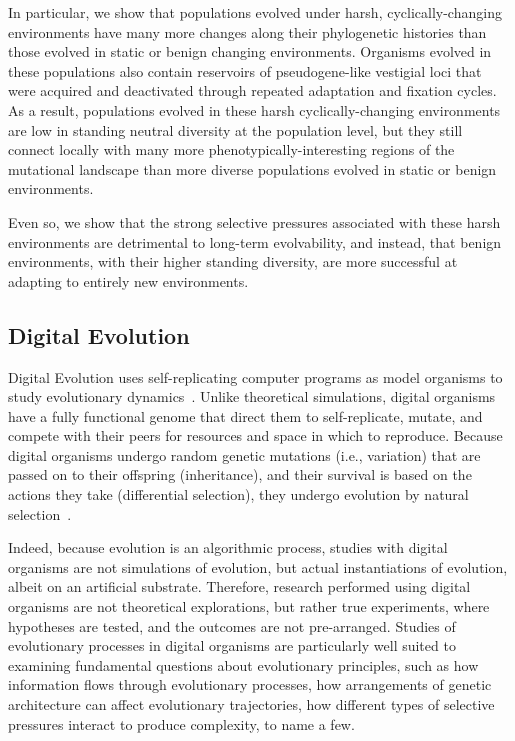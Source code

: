 \documentclass[10pt,letterpaper,final]{article}
\begin{document}
In particular, we show that populations evolved under harsh, cyclically-changing environments have many more changes along their phylogenetic histories than those evolved in static or benign changing environments. Organisms evolved in these populations also contain reservoirs of pseudogene-like vestigial loci that were acquired and deactivated through repeated adaptation and fixation cycles. As a result, populations evolved in these harsh cyclically-changing environments are low in standing neutral diversity at the population level, but they still connect locally with many more phenotypically-interesting regions of the mutational landscape than more diverse populations evolved in static or benign environments.

Even so, we show that the strong selective pressures associated with these harsh environments are detrimental to long-term evolvability, and instead, that benign environments, with their higher standing diversity, are more successful at adapting to entirely new environments.

\subsection*{Digital Evolution}
Digital Evolution uses self-replicating computer programs as model organisms to study evolutionary dynamics~\cite{mckinley_harnessing_2008}. Unlike theoretical simulations, digital organisms have a fully functional genome that direct them to self-replicate, mutate, and compete with their peers for resources and space in which to reproduce. Because digital organisms undergo random genetic mutations (i.e., variation) that are passed on to their offspring (inheritance), and their survival is based on the actions they take (differential selection), they undergo evolution by natural selection~\cite{dennett_darwins_1995}.

Indeed, because evolution is an algorithmic process, studies with digital organisms are not simulations of evolution, but actual instantiations of evolution, albeit on an artificial substrate. Therefore, research performed using digital organisms are not theoretical explorations, but rather true experiments, where hypotheses are tested, and the outcomes are not pre-arranged.
Studies of evolutionary processes in digital organisms are particularly well suited to examining  fundamental questions about evolutionary principles, such as how information flows through evolutionary processes, how arrangements of genetic architecture can affect evolutionary trajectories, how different types of selective pressures interact to produce complexity, to name a few. 
\end{document}
